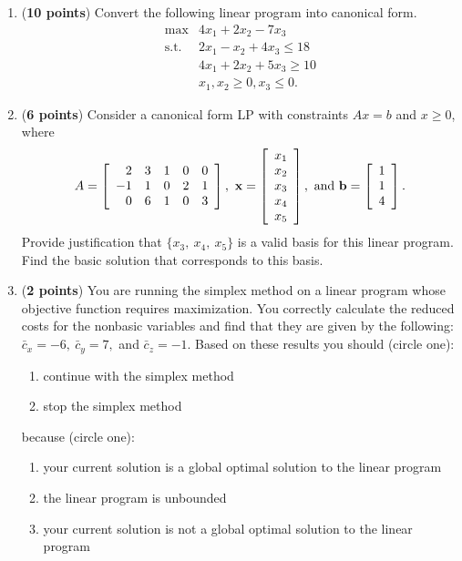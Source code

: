 \documentclass[10pt]{article}
\begin{document}
\begin{enumerate}
\item ({\bf 10 points}) Convert the following linear program into canonical form.
\[
\begin{array}{ll}
  \max & 4 x_1 + 2x_2 - 7 x_3 \\
  \mbox{s.t.} & 2 x_1 -  x_2 + 4 x_3 \leq 18 \\
  &  4 x_1 + 2 x_2 + 5 x_3 \geq 10 \\
  & x_1 , x_2 \geq 0, x_3 \leq 0.
\end{array}
\]

  \vfill

\item ({\bf 6 points}) Consider a canonical form LP with constraints $Ax=b$ and $x \geq 0$, where 
\[ 
A = \left[
\begin{array}{rrrrrrrrrr}
2 & 3 & 1 & 0 & 0\\
-1 & 1 & 0 & 2 & 1\\
0 & 6 & 1 & 0 & 3
\end{array}
\right],~
\mathbf{x} = \left[
\begin{array}{r}
x_1\\
x_2\\
x_3\\
x_4\\
x_5
\end{array}
\right],
\rm{~and~}
\mathbf{b} = \left[
\begin{array}{r}
1\\
1\\
4
\end{array}
\right].
\]
Provide justification that $\{x_3,~x_4,~x_5\}$ is a valid basis for this linear program.  Find the basic solution that corresponds to this basis.  
  \vfill

\newpage

\item ({\bf 2 points}) You are running the simplex method on a linear program whose objective function requires maximization.  You correctly calculate the reduced costs for the nonbasic variables and find that they are given by the following:  $\bar c_x = -6,~ \bar c_y = 7,$ and $\bar c_z = -1$.  Based on these results you should (circle one):  
\begin{enumerate}
\item continue with the simplex method
\item stop the simplex method
\end{enumerate}
because (circle one):
\begin{enumerate}
\item your current solution is a global optimal solution to the linear program
\item the linear program is unbounded
\item your current solution is not a global optimal solution to the linear program
\end{enumerate}
  \vfill


\end{enumerate}
\end{document}
